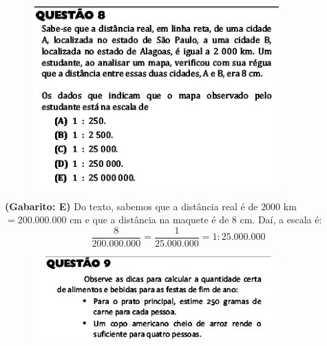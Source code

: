 \documentclass[a4paper]{article}
\begin{document}
\begin{figure}[H]
	\begin{center}
		\includegraphics[width=9.5cm]{L2Q8.png}
	\end{center}
\end{figure}
\par\textbf{(Gabarito: E)} Do texto, sabemos que a distância real é de $2000$ km $= 200.000.000$ cm e que a distância na maquete é de $8$ cm. Daí, a escala é:
\begin{equation*}
\frac{8}{200.000.000} = \frac{1}{25.000.000} = 1:25.000.000
\end{equation*}
\begin{figure}[H]
	\begin{center}
		\includegraphics[width=9.5cm]{L2Q9_1.png}
	\end{center}
\end{figure}
\end{document}
